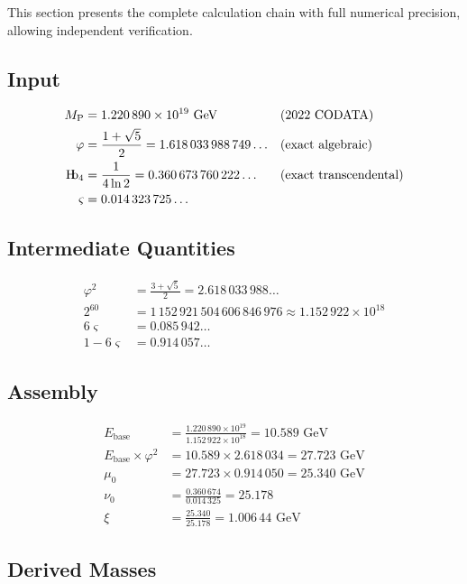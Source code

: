 \documentclass[11pt,a4paper]{article}
\theoremstyle{definition}
\theoremstyle{remark}
\newcommand{\Hb}{\textnormal{H\kern-0.3em b}}
\newcommand{\Hbfour}{\Hb_4}
\newcommand{\gr}{\varphi}
\newcommand{\gs}{\varsigma}
\newcommand{\murad}{\mu_0}
\newcommand{\nurad}{\nu_0}
\newcommand{\Mpl}{M_{\mathrm{P}}}
\newcommand{\Ebase}{E_{\mathrm{base}}}
\begin{document}
This section presents the complete calculation chain with full numerical precision, allowing independent verification.

\subsection{Input}

\begin{align}
\Mpl &= 1.220\,890 \times 10^{19} \text{ GeV} &&\text{(2022 CODATA)} \\
\gr &= \frac{1+\sqrt{5}}{2} = 1.618\,033\,988\,749\ldots &&\text{(exact algebraic)} \\
\Hbfour &= \frac{1}{4\ln 2} = 0.360\,673\,760\,222\ldots &&\text{(exact transcendental)} \\
\gs &= 0.014\,323\,725\ldots 
\end{align}

\subsection{Intermediate Quantities}

\begin{align}
\gr^2 &= \frac{3+\sqrt{5}}{2} = 2.618\,033\,988\ldots \\[4pt]
2^{60} &= 1\,152\,921\,504\,606\,846\,976 \approx 1.152\,922 \times 10^{18} \\[4pt]
6\gs &= 0.085\,942 \ldots\\[4pt]
1 - 6\gs &= 0.914\,057 \ldots
\end{align}

\subsection{Assembly}

\begin{align}
\Ebase &= \frac{1.220\,890 \times 10^{19}}{1.152\,922 \times 10^{18}} = 10.589 \text{ GeV} \\[6pt]
\Ebase \times \gr^2 &= 10.589 \times 2.618\,034 = 27.723 \text{ GeV} \\[6pt]
\murad &= 27.723 \times 0.914\,050 = 25.340 \text{ GeV} \\[6pt]
\nurad &= \frac{0.360\,674}{0.014\,325} = 25.178 \\[6pt]
\xi &= \frac{25.340}{25.178} = 1.006\,44 \text{ GeV}
\end{align}

\subsection{Derived Masses}
\end{document}
